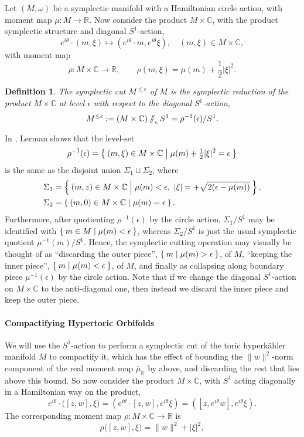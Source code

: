 \documentclass{amsart}
\newtheorem{definition}[theorem]{Definition}
\newcommand{\ra}{\rightarrow}
\newcommand{\w}{\omega}
\newcommand{\e}{\epsilon}
\newcommand{\RR}{\mathbb{R}}
\newcommand{\CC}{\mathbb{C}}
\newcommand{\sslash}{\mathbin{/\mkern-6mu/}}
\begin{document}
	Let $(M,\w)$ be a symplectic manifold with a Hamiltonian circle action, with moment map $\mu : M \ra \RR$. Now consider the product $M \times \CC$, with the product symplectic structure and diagonal $S^{1}$-action,
	\[
		e^{i\theta} \cdot (m, \xi) \longmapsto (e^{i\theta} \cdot m, e^{i\theta}\xi), \quad (m,\xi) \in M \times \CC,
	\]
	with moment map
	\[
		\rho : M \times \CC \ra \RR, \qquad \rho(m,\xi) = \mu(m) + \frac{1}{2}|\xi|^{2}.
	\]
	
	\begin{definition}
		The \emph{symplectic cut} $M^{\leq\e}$ of $M$ is the symplectic reduction of the product $M \times \CC$ at level $\e$ with respect to the diagonal $S^{1}$-action,
		\[
			M^{\leq\e} := (M \times \CC) \sslash_{\e} S^{1} = \rho^{-1}(\e)/S^{1}.
		\]
	\end{definition}
	
	In \cite{Ler95}, Lerman shows that the level-set
	\[
		\rho^{-1}(\e) = \Set{(m, \xi) \in M \times \CC | \mu(m) + \tfrac{1}{2}|\xi|^{2} = \e}
	\]
	is the same as the disjoint union $\Sigma_{1} \sqcup \Sigma_{2}$, where
	\begin{align*}
		\Sigma_{1} &= \Set{(m,z) \in M \times \CC | \mu(m) < \e,\ |\xi| = + \sqrt{2(\e - \mu(m))} }, \\
		\Sigma_{2} &= \Set{(m,0) \in M \times \CC | \mu(m) = \e}.
	\end{align*}
	Furthermore, after quotienting $\rho^{-1}(\e)$ by the circle action, $\Sigma_{1}/S^{1}$ may be identified with $\Set{m \in M | \mu(m) < \e}$, whereas $\Sigma_{2}/S^{1}$ is just the usual symplectic quotient $\mu^{-1}(m)/S^{1}$. Hence, the symplectic cutting operation may visually be thought of as ``discarding the outer piece'', $\Set{m | \mu(m) > \e}$, of $M$, ``keeping the inner piece'', $\Set{ m | \mu(m) < \e}$, of $M$, and finally as collapsing along boundary piece $\mu^{-1}(\e)$ by the circle action. Note that if we change the diagonal $S^{1}$-action on $M \times \CC$ to the anti-diagonal one, then instead we discard the inner piece and keep the outer piece.
	
	
	
	\paragraph{Compactifying Hypertoric Orbifolds}
	
	We will use the $S^{1}$-action to perform a symplectic cut of the toric hyperk\"ahler manifold $M$ to compactify it, which has the effect of bounding the $\|w\|^{2}$-norm component of the real moment map $\bar{\mu}_{\RR}$ by above, and discarding the rest that lies above this bound. So now consider the product $M \times \CC$, with $S^{1}$ acting diagonally in a Hamiltonian way on the product,
	$$
	e^{i\theta} \cdot \big( [z,w], \xi   \big) = \left( e^{i\theta} \cdot [z,w], e^{i\theta}\xi\right) = \left( [z,e^{i\theta}w], e^{i\theta}\xi\right).
	$$
	The corresponding moment map $\rho : M \times \CC \ra \RR$ is
	\[
	\rho\big( [z,w], \xi  \big) = \|w\|^{2} + |\xi|^{2},
	\]
	
\end{document}
